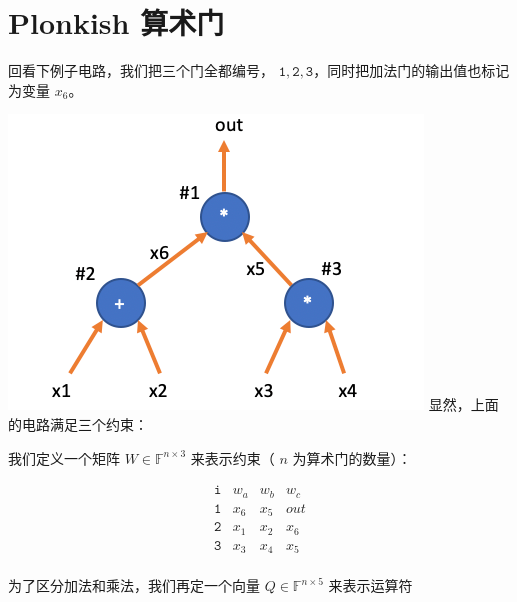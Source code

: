 \hypertarget{plonkish-ux7b97ux672fux95e8}{%
\section{Plonkish 算术门}\label{plonkish-ux7b97ux672fux95e8}}

回看下例子电路，我们把三个门全都编号，
\(\texttt{1},\texttt{2},\texttt{3}\)，同时把加法门的输出值也标记为变量
\(x_6\)。

\includegraphics{img/img20230414202348.png}
显然，上面的电路满足三个约束：


我们定义一个矩阵 \(W\in\mathbb{F}^{n\times 3}\) 来表示约束（ \(n\)
为算术门的数量）：

\[
\begin{array}{c|c|c|c|}
\texttt{i} & w_a & w_b & w_c  \\
\hline
\texttt{1} & x_6 & x_5 & out \\
\texttt{2} & x_1 & x_2 & x_6 \\
\texttt{3} & x_3 & x_4 & x_5 \\
\end{array}
\]

为了区分加法和乘法，我们再定一个向量 \(Q\in\mathbb{F}^{n\times5}\)
来表示运算符


